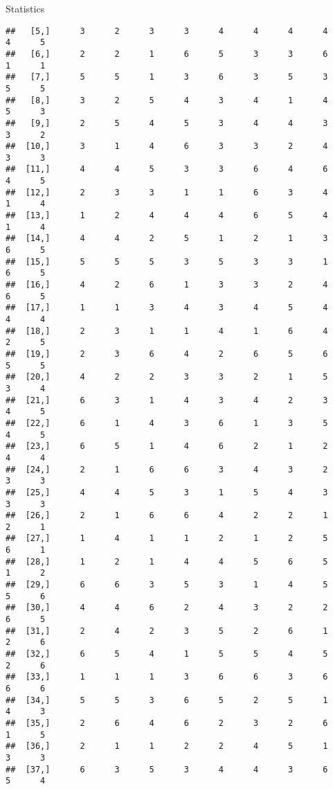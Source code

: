 \documentclass[
  ignorenonframetext,
]{beamer}
\begin{document}
\begin{frame}[fragile]{Statistics}
\begin{verbatim}
##   [5,]      3      2      3      3      4      4      4      4      4      5
##   [6,]      2      2      1      6      5      3      3      6      1      1
##   [7,]      5      5      1      3      6      3      5      3      5      5
##   [8,]      3      2      5      4      3      4      1      4      5      3
##   [9,]      2      5      4      5      3      4      4      3      3      2
##  [10,]      3      1      4      6      3      3      2      4      3      3
##  [11,]      4      4      5      3      3      6      4      6      4      5
##  [12,]      2      3      3      1      1      6      3      4      1      4
##  [13,]      1      2      4      4      4      6      5      4      1      4
##  [14,]      4      4      2      5      1      2      1      3      6      5
##  [15,]      5      5      5      3      5      3      3      1      6      5
##  [16,]      4      2      6      1      3      3      2      4      6      5
##  [17,]      1      1      3      4      3      4      5      4      4      4
##  [18,]      2      3      1      1      4      1      6      4      2      5
##  [19,]      2      3      6      4      2      6      5      6      5      5
##  [20,]      4      2      2      3      3      2      1      5      3      4
##  [21,]      6      3      1      4      3      4      2      3      4      5
##  [22,]      6      1      4      3      6      1      3      5      4      5
##  [23,]      6      5      1      4      6      2      1      2      4      4
##  [24,]      2      1      6      6      3      4      3      2      3      3
##  [25,]      4      4      5      3      1      5      4      3      3      3
##  [26,]      2      1      6      6      4      2      2      1      2      1
##  [27,]      1      4      1      1      2      1      2      5      6      1
##  [28,]      1      2      1      4      4      5      6      5      1      2
##  [29,]      6      6      3      5      3      1      4      5      5      6
##  [30,]      4      4      6      2      4      3      2      2      6      5
##  [31,]      2      4      2      3      5      2      6      1      2      6
##  [32,]      6      5      4      1      5      5      4      5      2      6
##  [33,]      1      1      1      3      6      6      3      6      6      6
##  [34,]      5      5      3      6      5      2      5      1      4      3
##  [35,]      2      6      4      6      2      3      2      6      1      5
##  [36,]      2      1      1      2      2      4      5      1      3      3
##  [37,]      6      3      5      3      4      4      3      6      5      4

\end{verbatim}
\end{frame}
\end{document}
